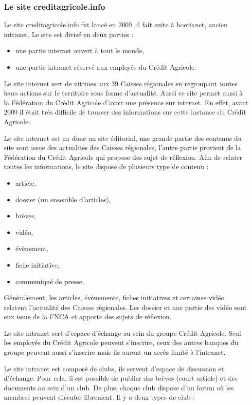 \documentclass[12pt,a4paper]{article}
\begin{document}
\subsubsection{Le site creditagricole.info}
Le site creditagricole.info fut lancé en 2009, il fait suite à boetianet, ancien intranet. Le site est divisé en deux parties :
\begin{itemize}
\item une partie internet ouvert à tout le monde,
\item une partie intranet réservé aux employés du Crédit Agricole.
\end{itemize}\par 
\medskip
Le site internet sert de vitrines aux 39 Caisses régionales en regroupant toutes leurs actions sur le territoire sous forme d'actualité. Aussi ce site permet aussi à la Fédération du Crédit Agricole d'avoir une présence sur internet. En effet, avant 2009 il était très difficile de trouver des informations sur cette instance du Crédit Agricole.\par
Le site internet est un donc un site éditorial, une grande partie des contenus du site sont issue des actualités des Caisses régionales, l'autre partie provient de la Fédération du Crédit Agricole qui propose des sujet de réflexion. Afin de relater toutes les informations, le site dispose de plusieurs type de contenu :
\begin{itemize}
\item article,
\item dossier (un ensemble d'articles),
\item brèves,
\item vidéo,
\item évènement,
\item fiche initiative,
\item communiqué de presse.
\end{itemize}\par
Généralement, les articles, évènements, fiches initiatives et certaines vidéo relatent l'actualité des Caisses régionales. Les dossier et une partie des vidéo sont eux issue de la FNCA et apporte des sujets de réflexion.\par
\bigskip
Le site intranet sert d'espace d'échange au sein du groupe Crédit Agricole. Seul les employés du Crédit Agricole peuvent s'inscrire, ceux des autres banques du groupe peuvent aussi s'inscrire mais ils auront un accès limité à l'intranet.\par 
Le site intranet est composé de clubs, ils servent d'espace de discussion et d'échange. Pour cela, il est possible de publier des brèves (court article) et des documents au sein d'un club. De plus, chaque club dispose d'un forum où les membres peuvent discuter librement. Il y a deux types de club : 
\end{document}
